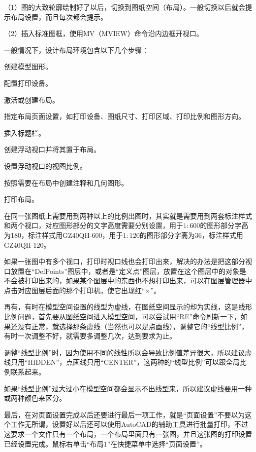 \begin{compactenum}
（1）图的大致轮廓绘制好了以后，切换到图纸空间（布局）。一般切换以后就会提示布局设置，而且每次都会提示。

（2）插入标准图框，使用MV（MVIEW）命令沿内边框开视口。
\end{compactenum}

一般情况下，设计布局环境包含以下几个步骤：

\begin{compactenum}
\item 创建模型图形。
\item 配置打印设备。
\item 激活或创建布局。
\item 指定布局页面设置，如打印设备、图纸尺寸、打印区域、打印比例和图形方向。
\item 插入标题栏。
\item 创建浮动视口并将其置于布局。
\item 设置浮动视口的视图比例。
\item 按照需要在布局中创建注释和几何图形。
\item 打印布局。
\end{compactenum}

在同一张图纸上需要用到两种以上的比例出图时，其实就是需要用到两套标注样式和两个视口，对应图形部分的文字高度需要分别设置，用于$1:600$的图形部分字高为180，标注样式用GZ40QH-600，用于$1:120$的图形部分字高为36，标注样式用GZ40QH-120。


如果一张图中有多个视口，打印时视口线也会打印出来，解决的办法是把这部分视口放置在“DefPoints”图层中，或者是“定义点”图层，放置在这个图层中的对象是不会被打印出来的，如果某个图层中的东西也不想打印出来，可以在图层管理器中点击对应图层后面的那个打印机，使它出现红“$\times$”。

再有，有时在模型空间设置的线型为虚线，在图纸空间显示的却为实线，这是线形比例问题，首先要从图纸空间进入模型空间，可以尝试用“RE”命令刷新一下，如果还没有正常，就选择那条虚线（当然也可以是点画线），调整它的“线型比例”，有时一次调整不好，就需要多调整几次，达到要求为止。


调整“线型比例”时，因为使用不同的线性所以会导致比例值差异很大，所以建议虚线只用“HIDDEN”，点画线只用“CENTER”，这两种的“线型比例”可以跟全局比例联系起来。

如果“线型比例”过大过小在模型空间都会显示不出线型来，所以建议虚线要用一种或两种颜色来区分。 

最后，在对页面设置完成以后还要进行最后一项工作，就是“页面设置”不要以为这个工作无所谓，设置好以后还可以使用AutoCAD的辅助工具进行批量打印，不过这要求一个文件只有一个布局，一个布局里面只有一张图，并且这张图的打印设置已经设置完成。鼠标右单击“布局1”在快捷菜单中选择“页面设置”。


